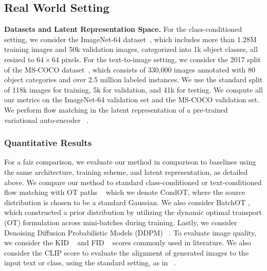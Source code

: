 \subsection{Real World Setting}


\noindent \textbf{Datasets and Latent Representation Space.} \quad
For the class-conditioned setting, we consider the ImageNet-64 dataset~\cite{deng2009imagenet}, which includes more than 1.28M training images and 50k validation images, categorized into 1k object classes, all resized to $64\times64$ pixels.  For the text-to-image setting, we consider the 2017 split of the MS-COCO dataset~\cite{lin2014microsoft}, which consists of 330,000 images annotated with 80 object categories and over 2.5 million labeled instances. We use the standard split of 118k images for training, 5k for validation, and 41k for testing. We compute all our metrics on the ImageNet-64 validation set and the MS-COCO validation set. We perform flow matching in the latent representation of a pre-trained variational auto-encoder ~\cite{oord2018neuraldiscreterepresentationlearning}. 











\subsubsection{Quantitative Results}
\label{sec:results_quantitative}





For a fair comparison, we evaluate our method in comparison to baselines using the same architecture, training scheme, and latent representation, as detailed above. We compare our method to standard class-conditioned or text-conditioned flow matching with OT paths ~\cite{lipman2022flow} which we denote CondOT, where the source distribution is chosen to be a standard Gaussian. We also consider BatchOT \cite{pooladian2023multisample}, which 
constructed a prior distribution by utilizing the dynamic optimal transport (OT) formulation across mini-batches
during training. Lastly, we consider Denoising Diffusion Probabilistic Models (DDPM) ~\cite{ho2020denoising}. To evaluate image quality, we consider the KID ~\cite{bińkowski2021demystifyingmmdgans} and FID ~\cite{heusel2018ganstrainedtimescaleupdate} scores commonly used in literature. We also consider the CLIP score to evaluate the alignment of generated images to the input text or class, using the standard setting, as in ~\cite{hessel2022clipscorereferencefreeevaluationmetric}.



